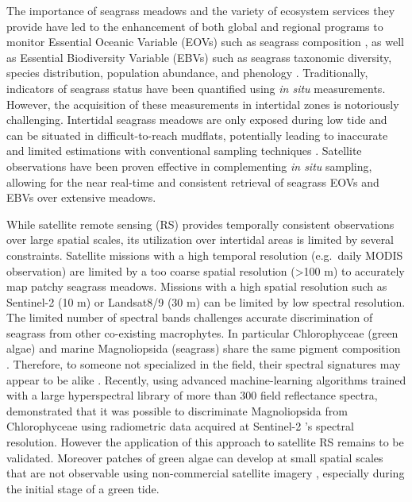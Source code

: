 \documentclass[
  number]{elsarticle}
\begin{document}
The importance of seagrass meadows and the variety of ecosystem services
they provide have led to the enhancement of both global and regional
programs to monitor Essential Oceanic Variable (EOVs) such as seagrass
composition \citep{Miloslavich2018}, as well as Essential Biodiversity
Variable (EBVs) such as seagrass taxonomic diversity, species
distribution, population abundance, and phenology \citep{Pereira2013}.
Traditionally, indicators of seagrass status have been quantified using
\emph{in situ} measurements. However, the acquisition of these
measurements in intertidal zones is notoriously challenging. Intertidal
seagrass meadows are only exposed during low tide and can be situated in
difficult-to-reach mudflats, potentially leading to inaccurate and
limited estimations with conventional sampling techniques
\citep{nijland2019}. Satellite observations have been proven effective
in complementing \emph{in situ} sampling, allowing for the near
real-time and consistent retrieval of seagrass EOVs and EBVs over
extensive meadows. \citetext{\citealp[ ]{Zoffoli2021}; \citealp[
]{xu2021}; \citealp[ ]{Traganos2018}; \citealp{coffer2023}}

While satellite remote sensing (RS) provides temporally consistent
observations over large spatial scales, its utilization over intertidal
areas is limited by several constraints. Satellite missions with a high
temporal resolution (e.g.~daily MODIS observation) are limited by a too
coarse spatial resolution (\textgreater100 m) to accurately map patchy
seagrass meadows. Missions with a high spatial resolution such as
Sentinel-2 (10 m) or Landsat8/9 (30 m) can be limited by low spectral
resolution. The limited number of spectral bands challenges accurate
discrimination of seagrass from other co-existing macrophytes. In
particular Chlorophyceae (green algae) and marine Magnoliopsida
(seagrass) share the same pigment composition \citetext{\citealp[
]{ralph2002}; \citealp{Douay2022}}. Therefore, to someone not
specialized in the field, their spectral signatures may appear to be
alike \citetext{\citealp[ ]{Davies2023}; \citealp{bannari2022}}.
Recently, using advanced machine-learning algorithms trained with a
large hyperspectral library of more than 300 field reflectance spectra,
\citep{Davies2023} demonstrated that it was possible to discriminate
Magnoliopsida from Chlorophyceae using radiometric data acquired at
Sentinel-2 's spectral resolution. However the application of this
approach to satellite RS remains to be validated. Moreover patches of
green algae can develop at small spatial scales that are not observable
using non-commercial satellite imagery \citep{tuya2013}, especially
during the initial stage of a green tide.
\end{document}
